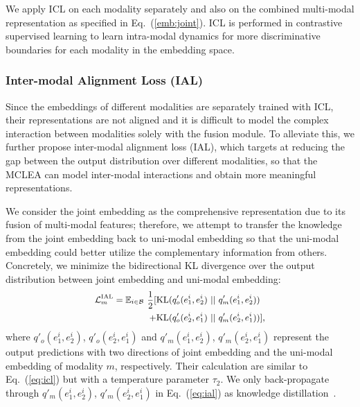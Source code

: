 \documentclass[11pt]{article}
\begin{document}
We apply ICL on each modality separately and also on the combined multi-modal representation as specified in Eq.~(\ref{emb:joint}).
ICL is performed in contrastive supervised learning to learn intra-modal dynamics for more discriminative boundaries for each modality in the embedding space. 


\subsubsection{Inter-modal Alignment Loss (IAL)}

Since the embeddings of different modalities are separately trained with ICL, their representations are not aligned and it is difficult to model the complex interaction between modalities solely with the fusion module.
To alleviate this, we further propose inter-modal alignment loss (IAL), which targets at reducing the gap between the output distribution over different modalities, so that the MCLEA can model inter-modal interactions and obtain more meaningful representations.

We consider the joint embedding as the comprehensive representation due to its fusion of multi-modal features; therefore, we attempt to transfer the knowledge from the joint embedding back to uni-modal embedding so that the uni-modal embedding could better utilize the complementary information from others.
Concretely, we minimize the bidirectional KL divergence over the output distribution between joint embedding and uni-modal embedding:
\begin{equation}
\begin{small}
\begin{aligned}
    \mathcal{L}^{\text{IAL}}_m
    = 
    \mathbb{E}_{i\in\mathcal{B}}\ 
    \frac{1}{2}
    [
    &\text{KL}(q'_o(e^i_1,e^i_2)\ ||\ q'_m(e^i_1,e^i_2)) \\
    \quad+ &\text{KL}(q'_o(e^i_2,e^i_1)\ ||\ q'_m(e^i_2,e^i_1))
    ],
\label{eq:ial}
\end{aligned}
\end{small}
\end{equation}
where $q'_o(e^i_1,e^i_2)$, $q'_o(e^i_2,e^i_1)$ and $q'_m(e^i_1,e^i_2)$, $q'_m(e^i_2,e^i_1)$ represent the output predictions with two directions of joint embedding and the uni-modal embedding of modality $m$, respectively.
Their calculation are similar to Eq.~(\ref{eq:icl}) but with a temperature parameter $\tau_2$.
We only back-propagate through $q'_m(e^i_1,e^i_2)$, $q'_m(e^i_2,e^i_1)$ in Eq.~(\ref{eq:ial}) as knowledge distillation~\cite{hinton2015distilling}.
\end{document}
